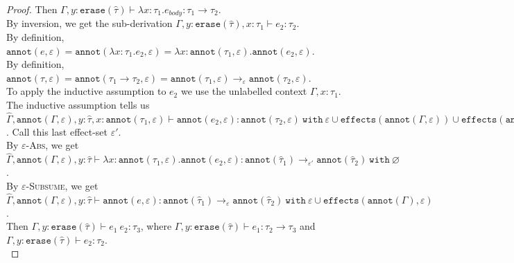 \documentclass{llncs}
\newcommand{\keywadj}[1]{\mathtt{#1}}
\newcommand{\keyw}[1]{\keywadj{#1}~}
\newcommand{\kw}[1]{\keyw{ #1 }}
\newcommand{\kwa}[1]{\keywadj{ #1 }}
\begin{document}
\begin{proof}
\noindent
{} Then $\Gamma, y: \kwa{erase}(\hat \tau) \vdash \lambda x: \tau_1.e_{body} : \tau_1 \rightarrow \tau_2$. \\

\noindent
By inversion, we get the sub-derivation $\Gamma, y: \kwa{erase}(\hat \tau), x:\tau_1  \vdash e_2: \tau_2$. \\

\noindent
By definition, $\kwa{annot}(e, \varepsilon) = \kwa{annot}(\lambda x: \tau_1.e_2, \varepsilon) = \lambda x: \kwa{annot}(\tau_1, \varepsilon).\kwa{annot}(e_2, \varepsilon)$. \\

\noindent
By definition, $\kwa{annot}(\tau, \varepsilon) = \kwa{annot}(\tau_1 \rightarrow \tau_2, \varepsilon) = \kwa{annot}(\tau_1, \varepsilon) \rightarrow_{\varepsilon} \kwa{annot}(\tau_2, \varepsilon)$. \\

\noindent
To apply the inductive assumption to $e_2$ we use the unlabelled context $\Gamma, x: \tau_1$. The inductive assumption tells us $\hat \Gamma, \kwa{annot}(\Gamma, \varepsilon), y: \hat \tau, x: \kwa{annot}(\tau_1, \varepsilon) \vdash \kwa{annot}(e_2, \varepsilon): \kwa{annot}(\tau_2, \varepsilon)~\kw{with} \varepsilon \cup \kwa{effects}(\kwa{annot}(\Gamma, \varepsilon)) \cup \kwa{effects}(\kwa{annot}(\tau_1, \varepsilon))$. Call this last effect-set $\varepsilon'$. \\

\noindent
By \textsc{$\varepsilon$-Abs}, we get $\hat \Gamma, \kwa{annot}(\Gamma, \varepsilon), y: \hat \tau \vdash \lambda x: \kwa{annot}(\tau_1, \varepsilon) . \kwa{annot}(e_2, \varepsilon) : \kwa{annot}(\hat \tau_1) \rightarrow_{\varepsilon'} \kwa{annot}(\hat \tau_2)~\kw{with} \varnothing$. \\

\noindent
By \textsc{$\varepsilon$-Subsume}, we get $\hat \Gamma, \kwa{annot}(\Gamma, \varepsilon), y: \hat \tau \vdash \kwa{annot}(e, \varepsilon) : \kwa{annot}(\hat \tau_1) \rightarrow_{\varepsilon} \kwa{annot}(\hat \tau_2)~\kw{with} \varepsilon \cup \kwa{effects}(\kwa{annot}(\Gamma), \varepsilon) $. \\

\noindent
{} Then $\Gamma, y: \kwa{erase}(\hat \tau) \vdash e_1~e_2: \tau_3$, where $\Gamma, y:\kwa{erase}(\hat \tau) \vdash e_1: \tau_2 \rightarrow \tau_3$ and $\Gamma, y: \kwa{erase}(\hat \tau) \vdash e_2: \tau_2$. \\


\end{proof}
\end{document}
